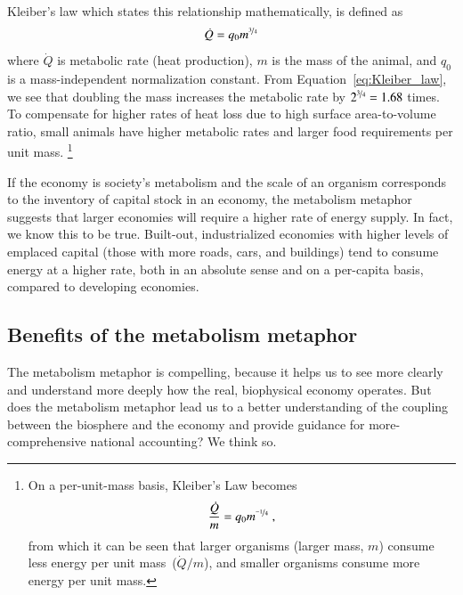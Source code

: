 Kleiber's law which states this relationship mathematically,
is defined as
%
\begin{equation}\label{eq:Kleiber_law}
	\dot{Q} = q_{0} m^{\nicefrac{3}{4}}
\end{equation}
%
where 
$\dot{Q}$ is metabolic rate (heat production),
$m$ is the mass of the animal, and
$q_{0}$ is a mass-independent normalization constant.
From Equation~\ref{eq:Kleiber_law},
we see that doubling the mass increases the metabolic rate by
$2^{\nicefrac{3}{4}} = 1.68$ times.
To compensate for higher rates of heat loss due to high surface area-to-volume ratio,
small animals have higher metabolic rates
and larger food requirements per unit mass.%
	\footnote{
	On a per-unit-mass basis, 
	Kleiber's Law becomes
	\begin{equation}
		\frac{\dot{Q}}{m} = q_{0} m^{\nicefrac{-1}{4}} \; ,
	\end{equation}
	from which it can be seen that 
	larger organisms (larger mass, $m$) consume less
	energy per unit mass~($\dot{Q}/m$), and 
	smaller organisms consume more
	energy per unit mass.
	}

If the economy is society's metabolism and 
the scale of an organism corresponds to the inventory 
of capital stock in an economy, 
the metabolism metaphor suggests that larger economies 
will require a higher rate of energy supply.
In fact, we know this to be true.
Built-out, industrialized economies with higher levels of emplaced capital
(those with more roads, cars, and buildings)
tend to consume energy at a higher rate, 
both in an absolute sense and on a per-capita basis,
compared to developing economies.


\subsection{Benefits of the metabolism metaphor}
\label{sec:metabolism_helps}

The metabolism metaphor is compelling, 
because it helps us to see more clearly
and understand more deeply
how the real, biophysical economy operates.
But does the metabolism metaphor lead us to a better understanding 
of the coupling between the biosphere and the economy 
and provide guidance for more-comprehensive national accounting?
We think so.

